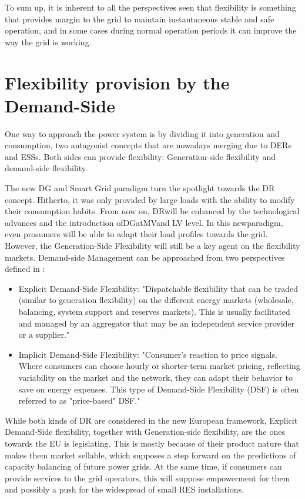 To sum up, it is inherent to all the perspectives seen that flexibility is something that provides margin to the grid to maintain instantaneous stable and safe operation, and in some cases during normal operation periods it can improve the way the grid is working.


\section{Flexibility provision by the Demand-Side}
One way to approach the power system is by dividing it into generation and consumption, two antagonist concepts that are nowadays merging due to DERs and ESSs. Both sides can provide flexibility: Generation-side flexibility and demand-side flexibility. 

The new DG and Smart Grid paradigm turn the spotlight towards the DR concept. Hitherto, it was only provided by large loads with the ability to modify their consumption habits. From now on, DRwill be enhanced by the technological advances and the introduction ofDGatMVand LV level. In this newparadigm, even prosumers will be able to adapt their load profiles towards the grid. However, the Generation-Side Flexibility will still be a key agent on the flexibility markets. Demand-side Management can be approached from two perspectives defined in \cite{USEF2018}:
\begin{itemize}
\item Explicit Demand-Side Flexibility: "Dispatchable flexibility that can be traded (similar to generation
flexibility) on the different energy markets (wholesale, balancing, system support and reserves
markets). This is usually facilitated and managed by an aggregator that may be an independent
service provider or a supplier."
\item Implicit Demand-Side Flexibility: "Consumer's reaction to price signals. Where consumers
can choose hourly or shorter-term market pricing, reflecting variability on the market and the network,
they can adapt their behavior to save on energy expenses. This type of Demand-Side Flexibility
(DSF) is often referred to as "price-based" DSF."
\end{itemize}

While both kinds of DR are considered in the new European framework, Explicit Demand-Side
flexibility, together with Generation-side flexibility, are the ones towards the EU is legislating.
This is mostly because of their product nature that makes them market sellable, which supposes
a step forward on the predictions of capacity balancing of future power grids. At the same time,
if consumers can provide services to the grid operators, this will suppose empowerment for
them and possibly a push for the widespread of small RES installations.

